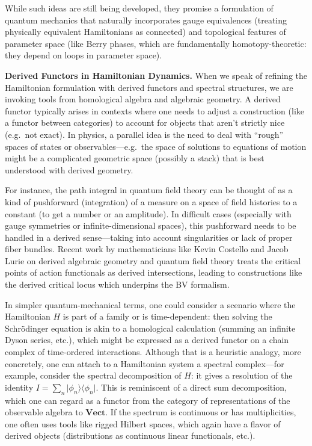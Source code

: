 \documentclass[12pt]{article}
\begin{document}
While such ideas are still being developed, they promise a formulation of quantum mechanics that naturally incorporates gauge equivalences (treating physically equivalent Hamiltonians as connected) and topological features of parameter space (like Berry phases, which are fundamentally homotopy-theoretic: they depend on loops in parameter space).

\medskip
\textbf{Derived Functors in Hamiltonian Dynamics.} When we speak of refining the Hamiltonian formulation with derived functors and spectral structures, we are invoking tools from homological algebra and algebraic geometry. A derived functor typically arises in contexts where one needs to adjust a construction (like a functor between categories) to account for objects that aren’t strictly nice (e.g.\ not exact). In physics, a parallel idea is the need to deal with ``rough'' spaces of states or observables---e.g.\ the space of solutions to equations of motion might be a complicated geometric space (possibly a stack) that is best understood with derived geometry. 

For instance, the path integral in quantum field theory can be thought of as a kind of pushforward (integration) of a measure on a space of field histories to a constant (to get a number or an amplitude). In difficult cases (especially with gauge symmetries or infinite-dimensional spaces), this pushforward needs to be handled in a derived sense---taking into account singularities or lack of proper fiber bundles. Recent work by mathematicians like Kevin Costello and Jacob Lurie on derived algebraic geometry and quantum field theory treats the critical points of action functionals as derived intersections, leading to constructions like the derived critical locus which underpins the BV formalism.

In simpler quantum-mechanical terms, one could consider a scenario where the Hamiltonian $H$ is part of a family or is time-dependent: then solving the Schrödinger equation is akin to a homological calculation (summing an infinite Dyson series, etc.), which might be expressed as a derived functor on a chain complex of time-ordered interactions. Although that is a heuristic analogy, more concretely, one can attach to a Hamiltonian system a spectral complex---for example, consider the spectral decomposition of $H$: it gives a resolution of the identity $I = \sum_n \lvert \phi_n \rangle \langle \phi_n \rvert$. This is reminiscent of a direct sum decomposition, which one can regard as a functor from the category of representations of the observable algebra to $\mathbf{Vect}$. If the spectrum is continuous or has multiplicities, one often uses tools like rigged Hilbert spaces, which again have a flavor of derived objects (distributions as continuous linear functionals, etc.). 
\end{document}
